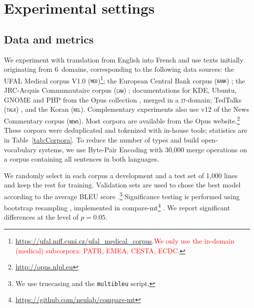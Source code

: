 \documentclass[11pt,a4paper]{article}
\newcommand{\fyDone}[1]{\done[FY]\Todo[FY:]{\textcolor{orange}{#1}}}
\newcommand{\revision}[1]{\textcolor{red}{#1}}
\newcommand{\domain}[1]{\texttt{\textsc{#1}}}
\begin{document}
\section{Experimental settings} \label{sec:exp}

\subsection{Data and metrics \label{ssec:corpora}}
We experiment with translation from English into French and use texts initially originating from 6~domains, corresponding to the following data sources: the UFAL Medical corpus V1.0 (\domain{med})\footnote{\url{https://ufal.mff.cuni.cz/ufal_medical_corpus}.\revision{We only use the in-domain (medical) subcorpora: PATR, EMEA, CESTA, ECDC.}}; the European Central Bank corpus (\domain{bank}) \cite{Tiedemann12parallel}; the JRC-Acquis Communautaire corpus (\domain{law}) \cite{Steinberger06acquis}; documentations for KDE, Ubuntu, GNOME and PHP from the Opus collection \cite{Tiedemann09news}, merged in a \domain{it}-domain; TedTalks (\domain{talk}) \cite{Cettolo12wit}, and the Koran (\domain{rel}). Complementary experiments also use v12 of the News Commentary corpus (\domain{news}). Most corpora are available from the Opus website.\footnote{\url{http://opus.nlpl.eu}} These corpora were deduplicated and tokenized with in-house tools; statistics are in Table~\ref{tab:Corpora}. To reduce the number of types and build open-vocabulary systems, we use Byte-Pair Encoding \cite{Sennrich16BPE} with 30,000 merge operations on a corpus containing all sentences in both languages.\fyDone{Add \# number of tokens, also specificity ?}%

We randomly select in each corpus a development and a test set of 1,000 lines and keep the rest for training. Validation sets are used to chose the best model according to the average BLEU score \cite{Papineni02bleu}.\footnote{We use truecasing and the \texttt{multibleu} script.}\fyDone{A word about meta-parameter settings} Significance testing is performed using bootstrap resampling \cite{Koehn04statistical}, implemented in compare-mt\footnote{\url{https://github.com/neulab/compare-mt}} \cite{Neubig19compare-mt}. We report significant differences at the level of $p=0.05$.\fyDone{Fix correct p value}

\end{document}
